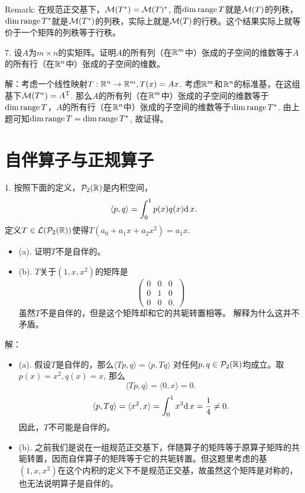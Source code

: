 \documentclass[hyperref,]{ctexart}
\providecommand{\tightlist}{%
  \setlength{\itemsep}{0pt}\setlength{\parskip}{0pt}}
\begin{document}
\smallskip

\noindent{} Remark: 在规范正交基下，\(\mathcal{M}(T^*)=\mathcal{M}(T)^*\),
而\(\mathrm{dim}\, \mathrm{range}\, T\)就是\(\mathcal{M}(T)\)的列秩，\(\mathrm{dim}\,\mathrm{range}\, T^*\)就是\(\mathcal{M}(T^*)\)的列秩，实际上就是\(\mathcal{M}(T)\)的行秩。这个结果实际上就等价于一个矩阵的列秩等于行秩。

\bigskip

\noindent{} 7.
设\(A\)为\(m\times n\)的实矩阵。证明\(A\)的所有列（在\(\mathbb{R}^m\)中）张成的子空间的维数等于\(A\)的所有行（在\(\mathbb{R}^n\)中）张成的子空间的维数。

\smallskip

\noindent{} 解：考虑一个线性映射\(T:\mathbb{R}^n\rightarrow\mathbb{R}^m,T(x)=Ax\).
考虑\(\mathbb{R}^m\)和\(\mathbb{R}^n\)的标准基，在这组基下\(\mathcal{M}(T^*)=A^{\mathrm{T}}\).
那么\(A\)的所有列（在\(\mathbb{R}^m\)中）张成的子空间的维数等于\(\mathrm{dim}\,\mathrm{range}\, T\)，\(A\)的所有行（在\(\mathbb{R}^n\)中）张成的子空间的维数等于\(\mathrm{dim}\,\mathrm{range}\, T^*\).
由上题可知\(\mathrm{dim}\,\mathrm{range}\, T=\mathrm{dim}\,\mathrm{range}\, T^*\), 故证得。

\section{自伴算子与正规算子}\label{ux81eaux4f34ux7b97ux5b50ux4e0eux6b63ux89c4ux7b97ux5b50}

\noindent{} 1. 按照下面的定义，\(\mathcal{P}_2(\mathbb{R})\)是内积空间，
\[\langle p,q\rangle =\int_0^1 p(x)q(x)\mathrm{d}\, x.\]
定义\(T\in\mathcal{L}(\mathcal{P}_2(\mathbb{R}))\)使得\(T(a_0+a_1x+a_2x^2)=a_1x\).

\begin{itemize}
\tightlist
\item
  (a). 证明\(T\)不是自伴的。
\item
  (b). \(T\)关于\((1,x,x^2)\)的矩阵是 \[
  \begin{pmatrix}
  0&0&0\\
  0&1&0\\
  0&0&0.
  \end{pmatrix}
  \] 虽然\(T\)不是自伴的，但是这个矩阵却和它的共轭转置相等。
  解释为什么这并不矛盾。
\end{itemize}

\smallskip

\noindent{} 解：

\begin{itemize}
\item
  (a).
  假设\(T\)是自伴的，那么\(\langle Tp,q\rangle = \langle p,Tq\rangle\)
  对任何\(p,q\in\mathcal{P}_2(\mathbb{R})\)均成立。取\(p(x)=x^2,q(x)=x\), 那么
  \[\langle Tp,q\rangle = \langle 0,x\rangle=0.\]
  \[\langle p,Tq\rangle = \langle x^2,x\rangle=\int_0^1x^3\mathrm{d}\, x=\frac14\ne0.\]
  因此，\(T\)不可能是自伴的。
\item
  (b).
  之前我们是说在一组规范正交基下，伴随算子的矩阵等于原算子矩阵的共轭转置，因而自伴算子的矩阵等于它的共轭转置。但这题里考虑的基\((1,x,x^2)\)在这个内积的定义下不是规范正交基，故虽然这个矩阵是对称的，也无法说明算子是自伴的。
\end{itemize}
\end{document}
